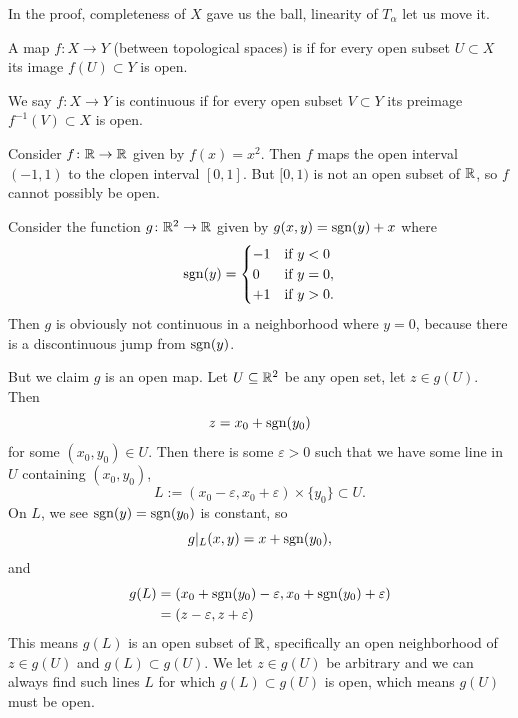 \begin{observation}
In the proof, completeness of $X$ gave us the ball, linearity of
$T_{\alpha}$ let us move it.
\end{observation}

\begin{definition}
A map $f\colon X\to Y$ (between topological spaces) is  if for every open subset
$U\subset X$ its image $f(U)\subset Y$ is open.
\end{definition}

\begin{recall}
We say $f\colon X\to Y$ is continuous if for every open subset
$V\subset Y$ its preimage $f^{-1}(V)\subset X$ is open.
\end{recall}

\begin{example}
Consider $f\colon\mathbb{R}\to\mathbb{R}$ given by $f(x)=x^{2}$. Then $f$ maps the
open interval $(-1,1)$ to the clopen interval $[0,1]$. But $[0,1)$ is
not an open subset of $\mathbb{R}$, so $f$ cannot possibly be open.
\end{example}

\begin{example}
Consider the function $g\colon\mathbb{R}^{2}\to\mathbb{R}$ given by
$g(x,y)=\operatorname{sgn}(y)+x$ where
\begin{equation}
\operatorname{sgn}(y)=\begin{cases}-1 & \mbox{if }y<0\\
0 & \mbox{if }y=0,\\
+1 & \mbox{if }y>0.
\end{cases}
\end{equation}
Then $g$ is obviously not continuous in a neighborhood where $y=0$,
because there is a discontinuous jump from $\operatorname{sgn}(y)$.

But we claim $g$ is an open map. Let $U\subseteq\mathbb{R}^{2}$ be any open
set, let $z\in g(U)$. Then
\begin{equation}
z=x_{0}+\operatorname{sgn}(y_{0})
\end{equation}
for some $(x_{0},y_{0})\in U$. Then there is some $\varepsilon>0$ such
that we have some line in $U$ containing $(x_{0},y_{0})$,
\begin{equation}
L:=(x_{0}-\varepsilon,x_{0}+\varepsilon)\times\{y_{0}\}\subset U.
\end{equation}
On $L$, we see $\operatorname{sgn}(y)=\operatorname{sgn}(y_{0})$ is constant, so
\begin{equation}
g|_{L}(x,y)=x+\operatorname{sgn}(y_{0}),
\end{equation}
and
\begin{equation}
\begin{split}
g(L)&=(x_{0}+\operatorname{sgn}(y_{0})-\varepsilon,x_{0}+\operatorname{sgn}(y_{0})+\varepsilon)\\
&=(z-\varepsilon,z+\varepsilon)
\end{split}
\end{equation}
This means $g(L)$ is an open subset of $\mathbb{R}$, specifically an open
neighborhood of $z\in g(U)$ and $g(L)\subset g(U)$. We let $z\in g(U)$
be arbitrary and we can always find such lines $L$ for which
$g(L)\subset g(U)$ is open, which means $g(U)$ must be open.
\end{example}

